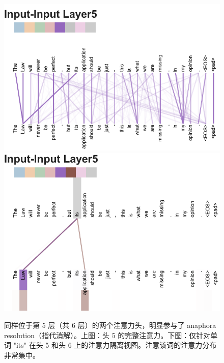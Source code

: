 \begin{figure}
{\includegraphics[width=\textwidth, trim=0 0 0 45, clip]{./vis/anaphora_resolution_new.pdf}}
{\includegraphics[width=\textwidth, trim=0 0 0 37, clip]{./vis/anaphora_resolution2_new.pdf}}
\caption{同样位于第 5 层（共 6 层）的两个注意力头，明显参与了 anaphora resolution（指代消解）。上图：头 5 的完整注意力。下图：仅针对单词 "its" 在头 5 和头 6 上的注意力隔离视图。注意该词的注意力分布非常集中。}
\end{figure}

